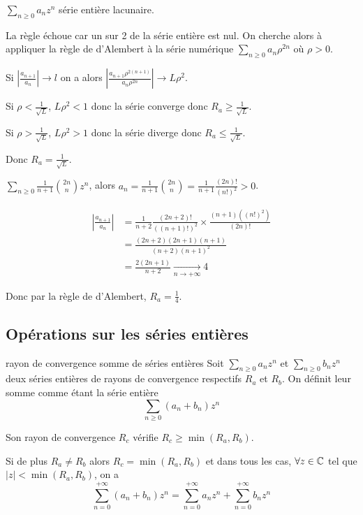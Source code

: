 \begin{exemple}
    $\sum_{n \geqslant 0 } a_n z^n$ série entière lacunaire. 

    La règle échoue car un sur 2 de la série entière est nul. On cherche alors à appliquer la règle 
    de d'Alembert à la série numérique $\sum_{n \geqslant 0} a_n \rho^{2n}$ où $\rho > 0$.

    Si $\left| \frac{a_{n + 1}}{a_n} \right| \to l$ on a alors 
    $\displaystyle \left| \frac{a_{n + 1} \rho^{2(n + 1)}}{a_n \rho^{2n}} \right| \to L \rho^2$. 

    Si $\rho < \frac 1 {\sqrt L}$, $L \rho^2 < 1$ donc la série converge donc $R_a \geqslant \frac 1 {\sqrt L}$.

    Si $\rho > \frac 1 {\sqrt L}$, $L \rho^2 > 1$ donc la série diverge donc $R_a \leqslant \frac 1 {\sqrt L}$.

    Donc $R_a = \frac 1 {\sqrt L}$.
\end{exemple}

\begin{exemple}
    $ \sum_{n \geqslant 0 } \frac 1 {n + 1} \binom{2n }{n } z^n$, alors $a_n = \frac 1 {n + 1} \binom{2n }{ n } = \frac{1 }{n + 1 } \frac{(2n)!}{(n!)^2} > 0$.

    \begin{align}
        \left| \frac{a_{n + 1 }}{a_n } \right| & = \frac 1 {n + 2} \frac{(2n + 2)!}{ ((n + 1)!)^2} \times \frac{(n + 1)((n!)^2)}{(2n)!} \\
        & = \frac{(2n + 2)(2n + 1)(n + 1)}{(n + 2)(n + 1)^2} \\
        & = \frac{2(2n + 1)}{n + 2} \xrightarrow[n \to + \infty ]{} 4
    \end{align}

    Donc par la règle de d'Alembert, $R_a = \frac 1 4$.
\end{exemple}

\subsection{Opérations sur les séries entières }

\begin{proposition}{rayon de convergence somme de séries entières}{}
    Soit $\sum_{n \geqslant 0} a_n z^n$ et $\sum_{n \geqslant 0} b_n z^n$ deux séries entières 
    de rayons de convergence respectifs $R_a$ et $R_b$. On définit leur somme comme étant la série 
    entière 
    $$\sum_{n \geqslant 0} (a_n + b_n) z^n$$

    Son rayon de convergence $R_c$ vérifie $R_c \geqslant \min(R_a, R_b)$.

    Si de plus $R_a \neq R_b$ alors $R_c = \min(R_a, R_b)$ et dans tous les cas, 
    $\forall z \in \mathbb{C}$ tel que $|z| < \min(R_a, R_b)$, on a
    $$\sum_{n = 0}^{+\infty} (a_n + b_n) z^n = \sum_{n = 0}^{+\infty} a_n z^n + \sum_{n = 0}^{+\infty} b_n z^n$$
\end{proposition}

